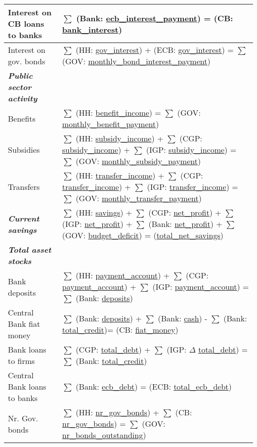 \begin{landscape}
\begin{table}
\begin{tabular}{|l|l|}
    Interest on CB loans to banks & $\sum$ (Bank: \url{ecb_interest_payment}) = (CB: \url{bank_interest})\\\hline
    Interest on gov. bonds  & $\sum$ (HH: \url{gov_interest}) + (ECB: \url{gov_interest}) = $\sum$ (GOV: \url{monthly_bond_interest_payment})\\
\hline
\textbf{\emph{Public sector activity}}  &\\
\hline
    Benefits    & $\sum$ (HH: \url{benefit_income}) = $\sum$ (GOV: \url{monthly_benefit_payment})\\\hline    
    Subsidies   & $\sum$ (HH: \url{subsidy_income}) +  $\sum$ (CGP: \url{subsidy_income}) + $\sum$ (IGP: \url{subsidy_income}) = $\sum$ (GOV: \url{monthly_subsidy_payment})\\\hline    
    Transfers   & $\sum$ (HH: \url{transfer_income}) +  $\sum$ (CGP: \url{transfer_income}) + $\sum$ (IGP: \url{transfer_income}) = $\sum$ (GOV: \url{monthly_transfer_payment})\\
    \hline
\textbf{\emph{Current savings}} & $\sum$ (HH: \url{savings}) +  $\sum$ (CGP: \url{net_profit}) + $\sum$ (IGP: \url{net_profit}) + $\sum$ (Bank: \url{net_profit}) + $\sum$ (GOV: \url{budget_deficit}) = (\url{total_net_savings}) \\
    \hline\hline
\textbf{\emph{Total asset stocks}}  &\\
    \hline
Bank deposits   & $\sum$ (HH: \url{payment_account}) + $\sum$ (CGP: \url{payment_account}) + $\sum$ (IGP: \url{payment_account}) = $\sum$ (Bank: \url{deposits})\\\hline
Central Bank fiat money & $\sum$ (Bank: \url{deposits}) + $\sum$ (Bank: \url{cash}) - $\sum$ (Bank: \url{total_credit})= (CB: \url{fiat_money})\\\hline
Bank loans to firms   & $\sum$ (CGP: \url{total_debt}) + $\sum$ (IGP: $\Delta$ \url{total_debt}) = $\sum$ (Bank:  \url{total_credit})\\\hline 
Central Bank loans to banks & $\sum$ (Bank: \url{ecb_debt}) = (ECB: \url{total_ecb_debt})\\\hline 
Nr. Gov. bonds      & $\sum$ (HH: \url{nr_gov_bonds}) + $\sum$ (CB: \url{nr_gov_bonds}) = $\sum$ (GOV: \url{nr_bonds_outstanding})\\\hline

\end{tabular}
\end{table}
\end{landscape}
